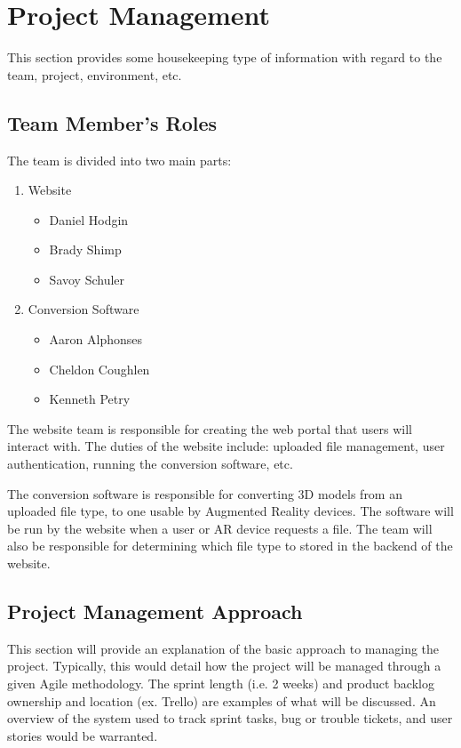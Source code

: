 

\chapter{Project Management}
This section provides some housekeeping type of information with regard to the 
team, project, environment, etc. 



\section{Team Member's Roles}
The team is divided into two main parts:

\begin{enumerate}
    \item Website
        \begin{itemize}
            \item Daniel Hodgin
            \item Brady Shimp
            \item Savoy Schuler
        \end{itemize}
    \item Conversion Software
        \begin{itemize}
            \item Aaron Alphonses
            \item Cheldon Coughlen
            \item Kenneth Petry
        \end{itemize}
\end{enumerate}

The website team is responsible for creating the web portal that users will 
interact with.  The duties of the website include: uploaded file management, 
user authentication, running the conversion software, etc.

The conversion software is responsible for converting 3D models from an uploaded 
file type, to one usable by Augmented Reality devices.  
The software will be run by the website when a user or AR device requests a
 file. 
The team will also be responsible for determining which file type to stored in
 the backend of the website.

\section{Project  Management Approach}
This section will provide an explanation of the basic approach to managing the 
project.  Typically, this would detail how the project will be managed through 
a given Agile methodology.  The sprint length (i.e. 2 weeks) and product backlog 
ownership and location (ex. Trello) are examples of what will be discussed.  An 
overview of the system used to track sprint tasks, bug or trouble tickets, and 
user stories would be warranted. 


